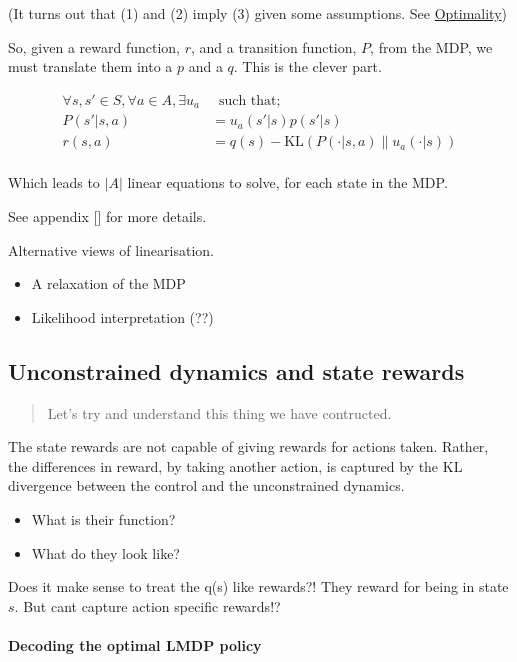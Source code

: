 (It turns out that (1) and (2) imply (3) given some assumptions. See
\href{}{Optimality})

So, given a reward function, \(r\), and a transition function, \(P\),
from the MDP, we must translate them into a \(p\) and a \(q\).
This is the clever part.

\begin{align}
\forall s, s' \in S, \forall a \in A, \exists u_a& \;\;\text{such that;} \\
P(s' | s, a) &= u_a(s'|s)p(s'|s) \tag{1}\\
r(s, a) &= q(s) - \text{KL}(P(\cdot | s, a) \parallel u_a(\cdot| s) ) \tag{2}\\
\end{align}

Which leads to \(|A|\) linear equations to solve, for each state in the
MDP.

See appendix [] for more details.

Alternative views of linearisation.

\begin{itemize}
\tightlist
\item
  A relaxation of the MDP
\item
  Likelihood interpretation (??)
\end{itemize}

\subsection{Unconstrained dynamics and state rewards}

\begin{quote}
Let's try and understand this thing we have contructed.
\end{quote}

The state rewards are not capable of giving rewards for actions taken.
Rather, the differences in reward, by taking another action, is captured
by the KL divergence between the control and the unconstrained dynamics.

\begin{itemize}
\tightlist
\item
  What is their function?
\item
  What do they look like?
\end{itemize}

Does it make sense to treat the q(s) like rewards?! They reward for being
in state $s$. But cant capture action specific rewards!?

\paragraph{Decoding the optimal LMDP policy}

